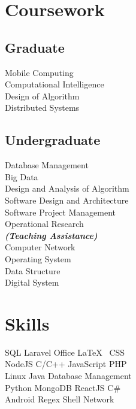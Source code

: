 \documentclass[letterpaper]{deedy-resume} %
\begin{document}
\begin{minipage}[t]{0.33\textwidth}

\section{Coursework}

\subsection{Graduate}
Mobile Computing \\
Computational Intelligence \\
Design of Algorithm \\
Distributed Systems \\
\sectionspace

\subsection{Undergraduate}
Database Management \\
Big Data \\
Design and Analysis of Algorithm \\
Software Design and Architecture \\
Software Project Management \\
Operational Research \\
{\footnotesize \textit{\textbf{(Teaching Assistance) }}} \\
Computer Network \\
Operating System \\
Data Structure \\
Digital System
\sectionspace


\section{Skills}

SQL \textbullet{} Laravel \textbullet{} Office \textbullet{} \LaTeX\ \textbullet{} CSS \\
NodeJS \textbullet{} C/C++ \textbullet{} JavaScript \textbullet{} PHP \\
Linux \textbullet{} Java \textbullet{} Database Management \\
Python \textbullet{} MongoDB \textbullet{} ReactJS \textbullet{} C\# \\
Android \textbullet{} Regex \textbullet{} Shell \textbullet{} Network
\sectionspace

\end{minipage} %
\end{document}
